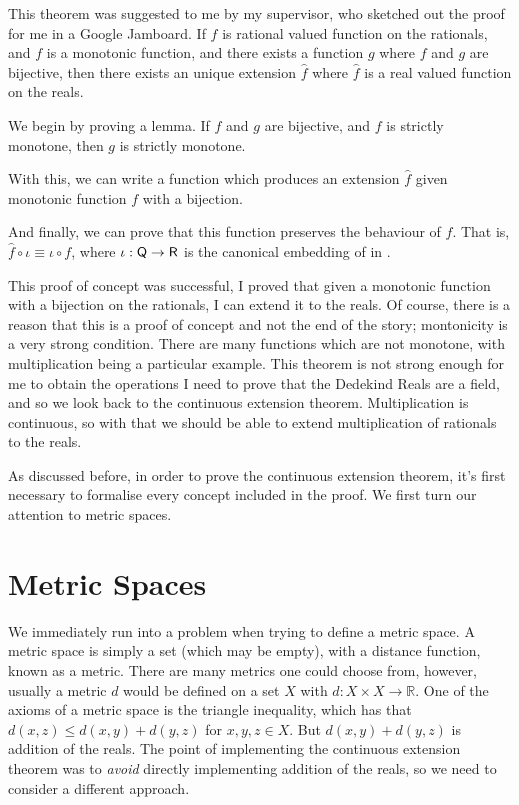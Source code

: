 \documentclass[ProjectReport]{subfiles}
\begin{document}
This theorem was suggested to me by my supervisor, who sketched out the proof for me in a Google Jamboard. If $f$ is rational valued function on the rationals, and $f$ is a monotonic function, and there exists a function $g$ where $f$ and $g$ are bijective, then there exists an unique extension $\hat{f}$ where $\hat{f}$ is a real valued function on the reals.

We begin by proving a lemma. If $f$ and $g$ are bijective, and $f$ is strictly monotone, then $g$ is strictly monotone.


With this, we can write a function which produces an extension $\hat{f}$ given monotonic function $f$ with a bijection. 


And finally, we can prove that this function preserves the behaviour of $f$. That is, $\hat{f} \circ \iota \equiv \iota \circ f$, where $\iota : \AgdaFunction{Q} \to \AgdaFunction{R}$ is the canonical embedding of  in .


This proof of concept was successful, I proved that given a monotonic function with a bijection on the rationals, I can extend it to the reals. Of course, there is a reason that this is a proof of concept and not the end of the story; montonicity is a very strong condition. There are many functions which are not monotone, with multiplication being a particular example. This theorem is not strong enough for me to obtain the operations I need to prove that the Dedekind Reals are a field, and so we look back to the continuous extension theorem. Multiplication is continuous, so with that we should be able to extend multiplication of rationals to the reals.


As discussed before, in order to prove the continuous extension theorem, it's first necessary to formalise every concept included in the proof. We first turn our attention to metric spaces.

\section{Metric Spaces}

We immediately run into a problem when trying to define a metric space. A metric space is simply a set (which may be empty), with a distance function, known as a metric. There are many metrics one could choose from, however, usually a metric $d$ would be defined on a set $X$ with $d : X \times X \to \mathbb{R}$. One of the axioms of a metric space is the triangle inequality, which has that $d(x , z) \leq d(x,y) + d(y,z)$ for $x , y , z \in X$. But $d(x,y) + d(y,z)$ is addition of the reals. The point of implementing the continuous extension theorem was to \textit{avoid} directly implementing addition of the reals, so we need to consider a different approach.
\end{document}
